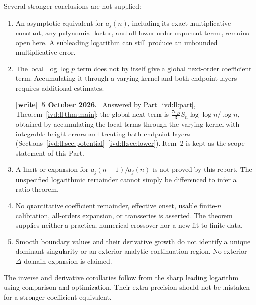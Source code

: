 \documentclass[11pt,letterpaper]{article}
\theoremstyle{remark}\newtheorem{remark}[theorem]{Remark}
\numberwithin{equation}{section}
\newenvironment{writenote}[1][]{\par\smallskip\begingroup\small
 \noindent\textbf{[write]}\if\relax\detokenize{#1}\relax\else~\textbf{#1.}\fi\ }%
 {\par\endgroup\smallskip}
\begin{document}
Several stronger conclusions are not supplied:
\begin{enumerate}
\item An asymptotic equivalent for $a_j(n)$, including its exact
multiplicative constant, any polynomial factor, and all lower-order
exponent terms, remains open here. A subleading logarithm can still
produce an unbounded multiplicative error.
\item The local $\log\log p$ term does not by itself give a global
next-order coefficient term. Accumulating it through a varying kernel
and both endpoint layers requires additional estimates.
\begin{writenote}[5 October 2026]
Answered by Part~\ref{ivd:ll:part}, Theorem~\ref{ivd:ll:thm:main}: the global next term is $\frac{7\sigma_D}3S_n\log\log n/\log n$, obtained by accumulating the local terms through the varying kernel with integrable height errors and treating both endpoint layers (Sections~\ref{ivd:ll:sec:potential}--\ref{ivd:ll:sec:lower}). Item~2 is kept as the scope statement of this Part.
\end{writenote}
\item A limit or expansion for $a_j(n+1)/a_j(n)$ is not proved by
this report. The unspecified logarithmic remainder cannot simply be
differenced to infer a ratio theorem.
\item No quantitative coefficient remainder, effective onset, usable
finite-$n$ calibration, all-orders expansion, or transseries is asserted.
The theorem supplies neither a practical numerical crossover nor a
new fit to finite data.
\item Smooth boundary values and their derivative growth do not identify
a unique dominant singularity or an exterior analytic continuation
region. No exterior $\Delta$-domain expansion is claimed.
\end{enumerate}
The inverse and derivative corollaries follow from the sharp leading
logarithm using comparison and optimization. Their extra precision
should not be mistaken for a stronger coefficient equivalent.
\end{document}
